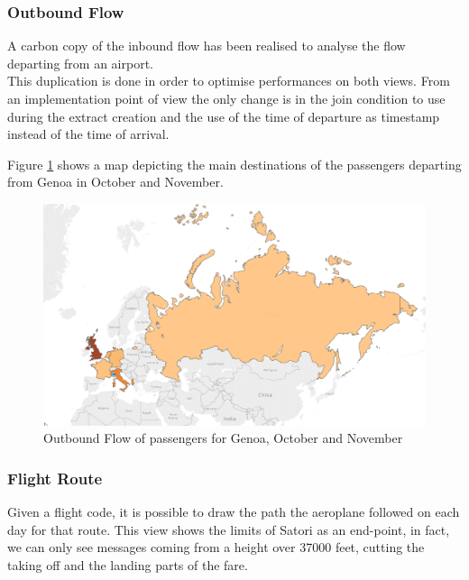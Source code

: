\subsubsection{Outbound Flow}
A carbon copy of the inbound flow has been realised to analyse the flow departing from an airport.\\
This duplication is done in order to optimise performances on both views. From an implementation point of view the only change is in the join condition to use during the extract creation and the use of the time of departure as timestamp instead of the time of arrival.

Figure \ref{fig:PassengersViz} shows a map depicting the main destinations of the passengers departing from Genoa in October and November.

\begin{figure}[h]
	\centering
	\includegraphics[width=0.9\linewidth]{Figures/PassengersViz.png}
	\caption{Outbound Flow of passengers for Genoa, October and November}
	\label{fig:PassengersViz}
\end{figure}

\subsubsection{Flight Route}
Given a flight code, it is possible to draw the path the aeroplane followed on each day for that route. This view shows the limits of Satori as an end-point, in fact, we can only see messages coming from a height over 37000 feet, cutting the taking off and the landing parts of the fare.


